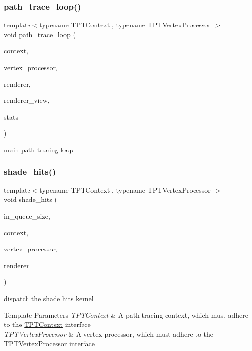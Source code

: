 \subsubsection{\texorpdfstring{path\+\_\+trace\+\_\+loop()}{path\_trace\_loop()}}
{\footnotesize\ttfamily template$<$typename T\+P\+T\+Context , typename T\+P\+T\+Vertex\+Processor $>$ \\
void path\+\_\+trace\+\_\+loop (\begin{DoxyParamCaption}\item[{T\+P\+T\+Context \&}]{context,  }\item[{T\+P\+T\+Vertex\+Processor \&}]{vertex\+\_\+processor,  }\item[{\hyperlink{struct_rendering_context}{Rendering\+Context} \&}]{renderer,  }\item[{\hyperlink{struct_rendering_context_view}{Rendering\+Context\+View} \&}]{renderer\+\_\+view,  }\item[{\hyperlink{struct_p_t_loop_stats}{P\+T\+Loop\+Stats} \&}]{stats }\end{DoxyParamCaption})}

main path tracing loop \mbox{\label{group___p_t_lib_ga303934170f8bdcf0d8c674d7bc2f2513}} 
\subsubsection{\texorpdfstring{shade\+\_\+hits()}{shade\_hits()}}
{\footnotesize\ttfamily template$<$typename T\+P\+T\+Context , typename T\+P\+T\+Vertex\+Processor $>$ \\
void shade\+\_\+hits (\begin{DoxyParamCaption}\item[{const uint32}]{in\+\_\+queue\+\_\+size,  }\item[{T\+P\+T\+Context}]{context,  }\item[{T\+P\+T\+Vertex\+Processor}]{vertex\+\_\+processor,  }\item[{\hyperlink{struct_rendering_context_view}{Rendering\+Context\+View}}]{renderer }\end{DoxyParamCaption})}

dispatch the shade hits kernel


\begin{DoxyTemplParams}{Template Parameters}
{\em T\+P\+T\+Context} & A path tracing context, which must adhere to the \hyperlink{_p_t_lib_page_TPTContext}{T\+P\+T\+Context} interface \\
\hline
{\em T\+P\+T\+Vertex\+Processor} & A vertex processor, which must adhere to the \hyperlink{_p_t_lib_page_TPTVertexProcessor}{T\+P\+T\+Vertex\+Processor} interface \\
\hline
\end{DoxyTemplParams}
\mbox{\label{group___p_t_lib_ga90f55f0d6d838b4bc1a09c6682fbd709}} 
